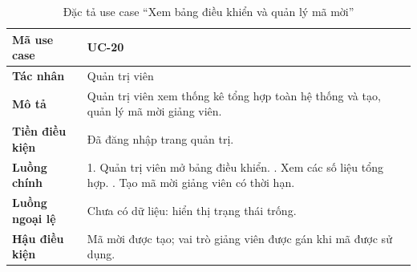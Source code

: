 \begin{table}[H]
\centering
\small
\caption{Đặc tả use case ``Xem bảng điều khiển và quản lý mã mời''}
\label{tab:uc-dashboard}
\begin{tabular}{|p{3cm}|p{10.6cm}|}
\hline
\textbf{Mã use case} & UC-20 \\ \hline
\textbf{Tác nhân} & Quản trị viên \\ \hline
\textbf{Mô tả} & Quản trị viên xem thống kê tổng hợp toàn hệ thống và tạo, quản lý mã mời giảng viên. \\ \hline
\textbf{Tiền điều kiện} & Đã đăng nhập trang quản trị. \\ \hline
\textbf{Luồng chính} & 1. Quản trị viên mở bảng điều khiển. \newline 2. Xem các số liệu tổng hợp. \newline 3. Tạo mã mời giảng viên có thời hạn. \\ \hline
\textbf{Luồng ngoại lệ} & Chưa có dữ liệu: hiển thị trạng thái trống. \\ \hline
\textbf{Hậu điều kiện} & Mã mời được tạo; vai trò giảng viên được gán khi mã được sử dụng. \\ \hline
\end{tabular}
\end{table}
